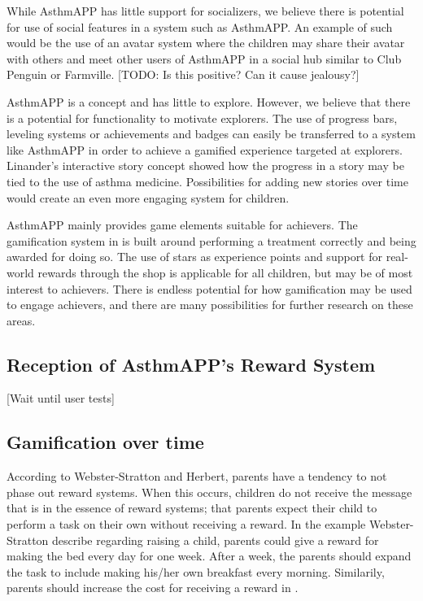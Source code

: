 While AsthmAPP has little support for socializers, we believe there is potential for use of social features in a system such as AsthmAPP. An example of such would be the use of an avatar system where the children may share their avatar with others and meet other users of AsthmAPP in a social hub similar to Club Penguin or Farmville. 
[TODO: Is this positive? Can it cause jealousy?]

AsthmAPP is a concept and has little to explore. However, we believe that there is a potential for functionality to motivate explorers. The use of progress bars, leveling systems or achievements and badges can easily be transferred to a system like AsthmAPP in order to achieve a gamified experience targeted at explorers. Linander's interactive story concept showed how the progress in a story may be tied to the use of asthma medicine\cite{linander2013utvikling}. Possibilities for adding new stories over time would create an even more engaging system for children. 

AsthmAPP mainly provides game elements suitable for achievers. The gamification system in \app{} is built around performing a treatment correctly and being awarded for doing so. The use of stars as experience points and support for real-world rewards through the shop is applicable for all children, but may be of most interest to achievers. There is endless potential for how gamification may be used to engage achievers, and there are many possibilities for further research on these areas. 


\subsection{Reception of AsthmAPP's Reward System}
\label{sec:receptionofrewardsystem}
[Wait until user tests]


\subsection{Gamification over time}
\label{sec:gamificationovertime}
According to Webster-Stratton and Herbert, parents have a tendency to not phase out reward systems\cite{webster1994troubled}. When this occurs, children do not receive the message that is in the essence of reward systems; that parents expect their child to perform a task on their own without receiving a reward. In the example Webster-Stratton \etal{} describe regarding raising a child, parents could give a reward for making the bed every day for one week. After a week, the parents should expand the task to include making his/her own breakfast every morning. Similarily, parents should increase the cost for receiving a reward in \app{}.  

